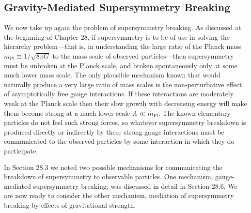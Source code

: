 
\subsection{Gravity-Mediated Supersymmetry Breaking}

We now take up again the problem of supersymmetry breaking. As discussed at
the beginning of Chapter 28, if supersymmetry is to be of use in solving the
hierarchy problem---that is, in understanding the large ratio of the Planck
mass \(m_{\mathrm{Pl}}\equiv 1/\sqrt{8\pi G}\) to the mass scale of observed
particles---then supersymmetry must be unbroken at the Planck scale, and
broken spontaneously only at some much lower mass scale. The only plausible
mechanism known that would naturally produce a very large ratio of mass
scales is the non-perturbative effect of asymptotically free gauge
interactions. If these interactions are moderately weak at the Planck scale
then their slow growth with decreasing energy will make them become strong
at a much lower scale \(\Lambda\ll m_{\mathrm{Pl}}\). The known elementary
particles do not feel such strong forces, so whatever supersymmetry
breakdown is produced directly or indirectly by these strong gauge
interactions must be communicated to the observed particles by some
interaction in which they do participate.

In Section 28.3 we noted two possible mechanisms for communicating the
breakdown of supersymmetry to observable particles. One mechanism,
gauge-mediated supersymmetry breaking, was discussed in detail in Section
28.6. We are now ready to consider the other mechanism, mediation of
supersymmetry breaking by effects of gravitational strength.

